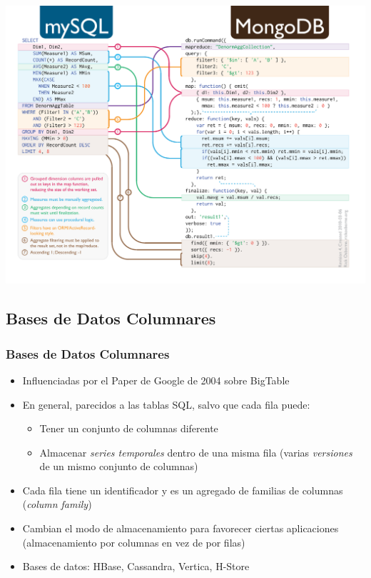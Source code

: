 \documentclass[14pt]{beamer}
\begin{document}
\begin{frame}[plain]
  \includegraphics[width=\textwidth]{img/sql-to-mongodb}
\end{frame}


\subsection{Bases de Datos Columnares}

\begin{frame}
  \frametitle{Bases de Datos Columnares}
\begin{itemize}
\item Influenciadas por el Paper de Google de 2004 sobre BigTable
\item En general, parecidos a las tablas SQL, salvo que cada fila puede:
  \begin{itemize}
  \item Tener un conjunto de columnas diferente
\item Almacenar {\em series temporales} dentro de una misma fila (varias
  {\em versiones} de un mismo conjunto de columnas)
  \end{itemize}
\item Cada fila tiene un identificador y es un agregado de familias de
  columnas ({\em column family})

\item Cambian el modo de almacenamiento para favorecer ciertas aplicaciones
  (almacenamiento por columnas en vez de por filas)
\item Bases de datos: HBase, Cassandra, Vertica, H-Store
\end{itemize}
\end{frame}
\end{document}
